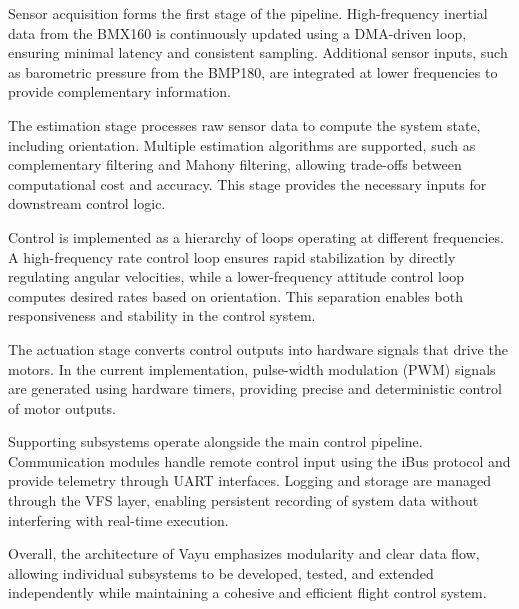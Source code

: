 Sensor acquisition forms the first stage of the pipeline. High-frequency inertial data from the BMX160 is continuously updated using a DMA-driven loop, ensuring minimal latency and consistent sampling. Additional sensor inputs, such as barometric pressure from the BMP180, are integrated at lower frequencies to provide complementary information.

The estimation stage processes raw sensor data to compute the system state, including orientation. Multiple estimation algorithms are supported, such as complementary filtering and Mahony filtering, allowing trade-offs between computational cost and accuracy. This stage provides the necessary inputs for downstream control logic.

Control is implemented as a hierarchy of loops operating at different frequencies. A high-frequency rate control loop ensures rapid stabilization by directly regulating angular velocities, while a lower-frequency attitude control loop computes desired rates based on orientation. This separation enables both responsiveness and stability in the control system.

The actuation stage converts control outputs into hardware signals that drive the motors. In the current implementation, pulse-width modulation (PWM) signals are generated using hardware timers, providing precise and deterministic control of motor outputs.

Supporting subsystems operate alongside the main control pipeline. Communication modules handle remote control input using the iBus protocol and provide telemetry through UART interfaces. Logging and storage are managed through the VFS layer, enabling persistent recording of system data without interfering with real-time execution.

Overall, the architecture of Vayu emphasizes modularity and clear data flow, allowing individual subsystems to be developed, tested, and extended independently while maintaining a cohesive and efficient flight control system.